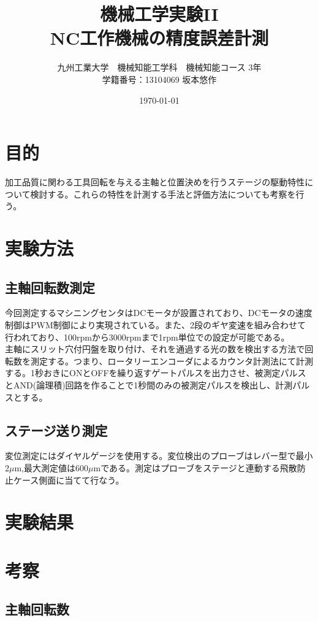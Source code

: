 \documentclass[a4j,twoside,openright,11pt]{jarticle}
\title{機械工学実験I\hspace{-.1em}I\\NC工作機械の精度誤差計測}
\author{九州工業大学　機械知能工学科　機械知能コース 3年\\学籍番号：13104069 坂本悠作}
\date{\today}
\begin{document}
\maketitle
\newpage
\section{目的}
加工品質に関わる工具回転を与える主軸と位置決めを行うステージの駆動特性について検討する。これらの特性を計測する手法と評価方法についても考察を行う。
\section{実験方法}
\subsection{主軸回転数測定}
今回測定するマシニングセンタはDCモータが設置されており、DCモータの速度制御はPWM制御により実現されている。また、2段のギヤ変速を組み合わせて行われており、100rpmから3000rpmまで1rpm単位での設定が可能である。\\
主軸にスリット穴付円盤を取り付け、それを通過する光の数を検出する方法で回転数を測定する。つまり、ロータリーエンコーダによるカウンタ計測法にて計測する。1秒おきにONとOFFを繰り返すゲートパルスを出力させ、被測定パルスとAND(論理積)回路を作ることで1秒間のみの被測定パルスを検出し、計測パルスとする。
\subsection{ステージ送り測定}
変位測定にはダイヤルゲージを使用する。変位検出のプローブはレバー型で最小2$\mu$m,最大測定値は600$\mu$mである。測定はプローブをステージと連動する飛散防止ケース側面に当てて行なう。
\section{実験結果}
\newpage
\section{考察}
\subsection{主軸回転数}
\end{document}
